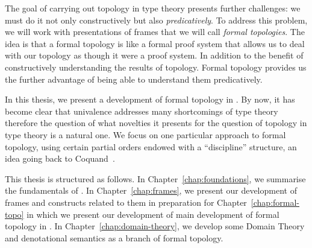 The goal of carrying out topology in type theory presents further challenges: we must do
it not only constructively but also \emph{predicatively}. To address this problem, we will
work with presentations of frames that we will call \emph{formal topologies}. The idea is
that a formal topology is like a formal proof system that allows us to deal with our
topology as though it were a proof system. In addition to the benefit of constructively
understanding the results of topology. Formal topology provides us the further advantage
of being able to understand them predicatively.

In this thesis, we present a development of formal topology in \UF{}. By now, it has
become clear that univalence addresses many shortcomings of type theory therefore the
question of what novelties it presents for the question of topology in type theory is a
natural one. We focus on one particular approach to formal topology, using certain partial
orders endowed with a ``discipline'' structure, an idea going back to
Coquand~\cite{coq-posets}.

This thesis is structured as follows. In Chapter~\ref{chap:foundations}, we summarise the
fundamentals of \UF{}. In Chapter~\ref{chap:frames}, we present our development of frames
and constructs related to them in preparation for Chapter~\ref{chap:formal-topo} in which
we present our development of main development of formal topology in \UF{}. In
Chapter~\ref{chap:domain-theory}, we develop some Domain Theory and denotational semantics
as a branch of formal topology.
